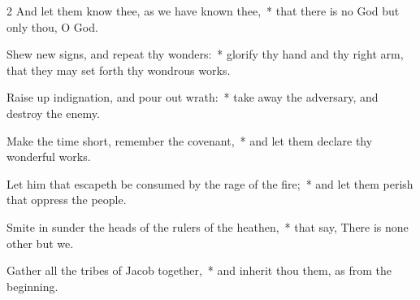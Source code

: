 \begin{multicols}{2}
And let them know thee, as we have known thee,~* that there is no God but only thou, O God.\par
Shew new signs, and repeat thy wonders:~* glorify thy hand and thy right arm, that they may set forth thy wondrous works.\par
Raise up indignation, and pour out wrath:~* take away the adversary, and destroy the enemy.\par
Make the time short, remember the covenant,~* and let them declare thy wonderful works.\par
Let him that escapeth be consumed by the rage of the fire;~* and let them perish that oppress the people.\par
Smite in sunder the heads of the rulers of the heathen,~* that say, There is none other but we.\par
Gather all the tribes of Jacob together,~* and inherit thou them, as from the beginning.
\end{multicols}